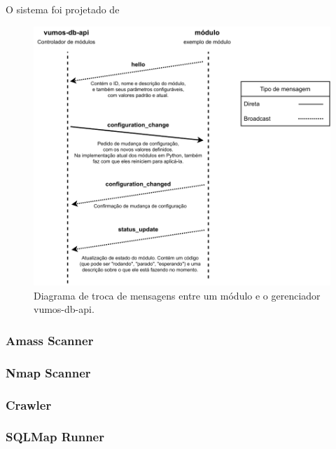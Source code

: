        O sistema foi projetado de 
        
        \begin{figure}
            \includegraphics[scale=0.8]{figuras/vumos-module-communication.drawio.pdf}
            \caption{Diagrama de troca de mensagens entre um módulo e o gerenciador vumos-db-api.\label{fig:microservices}}
        \end{figure}
        
        \subsubsection{Amass Scanner}
        \subsubsection{Nmap Scanner}
        \subsubsection{Crawler}
        \subsubsection{SQLMap Runner}
    
